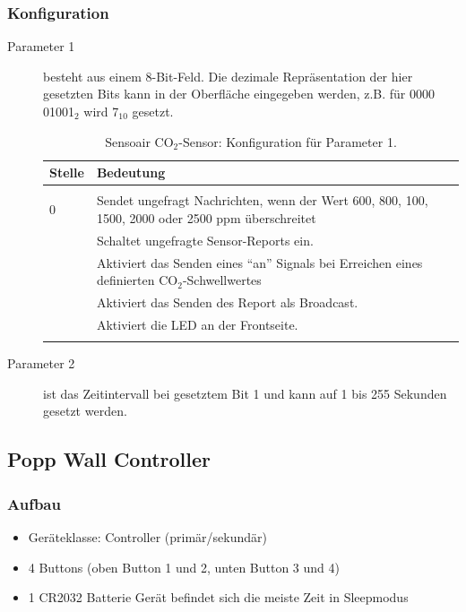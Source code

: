 \subsubsection{Konfiguration}
\begin{description}
	\item [Parameter 1] besteht aus einem 8-Bit-Feld. Die dezimale Repräsentation der hier gesetzten Bits kann in der Oberfläche eingegeben werden, z.B. für 0000 01001$_2$ wird 7$_{10}$ gesetzt.
	\begin{longtabu} to 
		\hline
		\textbf{Stelle}		& \textbf{Bedeutung} \\
		\hline
		\endhead
		  \\ 
		\endfoot
		\endlastfoot
		0					& Sendet ungefragt Nachrichten, wenn der Wert 600, 800, 100, 1500, 2000 oder 2500 \gls{ppm} überschreitet\\ 
							& Schaltet ungefragte Sensor-Reports ein.
		\\
							& Aktiviert das Senden eines "`an"' Signals bei Erreichen eines definierten CO$_2$-Schwellwertes \\
							& Aktiviert das Senden des Report als Broadcast. \\
							& Aktiviert die LED an der Frontseite. \\
		\hline
		\caption{Sensoair CO$_2$-Sensor: Konfiguration für Parameter 1.}
	\end{longtabu}
	\item [Parameter 2] ist das Zeitintervall bei gesetztem Bit 1 und kann auf 1 bis 255 Sekunden gesetzt werden.
\end{description}


\newpage
\subsection{Popp Wall Controller}
\subsubsection{Aufbau}
\begin{itemize}
	\item Geräteklasse: Controller (primär/sekundär)
	\item 4 Buttons (oben Button 1 und 2, unten Button 3 und 4)
	\item 1 CR2032 Batterie \textrightarrow{ }Gerät befindet sich die meiste Zeit in Sleepmodus
\end{itemize}

